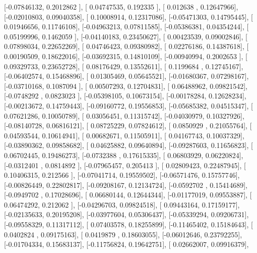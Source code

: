 \documentclass{article}
\begin{document}
       [-0.07846132,  0.2012862 ],
       [ 0.04747535,  0.192335  ],
       [ 0.012638  ,  0.12647966],
       [-0.02010803,  0.09040358],
       [ 0.10008914,  0.12317086],
       [-0.05471303,  0.14795445],
       [ 0.01946656,  0.11746108],
       [-0.04963213,  0.07811585],
       [-0.05386381,  0.04354244],
       [ 0.05199996,  0.1462059 ],
       [-0.04140183,  0.23450627],
       [ 0.00423539,  0.09002846],
       [ 0.07898034,  0.22652269],
       [ 0.04746423,  0.09380982],
       [ 0.02276186,  0.14387618],
       [ 0.00190509,  0.18622016],
       [-0.03692315,  0.14810109],
       [-0.00940994,  0.2002653 ],
       [ 0.09329733,  0.23652728],
       [ 0.08176429,  0.13552611],
       [ 0.1199684 ,  0.12745167],
       [-0.06402574,  0.15468896],
       [ 0.01305469,  0.05645521],
       [-0.01680367,  0.07298167],
       [-0.03710168,  0.1087094 ],
       [ 0.00507293,  0.12704831],
       [ 0.06488962,  0.09821542],
       [-0.0748292 ,  0.0823023 ],
       [-0.05398105,  0.10673154],
       [-0.00178284,  0.12628234],
       [-0.00213672,  0.14759443],
       [-0.09160772,  0.19556853],
       [-0.05685382,  0.04515347],
       [ 0.07621286,  0.10050789],
       [ 0.03056451,  0.11315742],
       [-0.04030979,  0.10327926],
       [-0.08140728,  0.06816121],
       [ 0.08725229,  0.07824612],
       [ 0.0850929 ,  0.21055764],
       [ 0.04593544,  0.10614941],
       [ 0.00682671,  0.11505911],
       [ 0.04167743,  0.10037329],
       [-0.03890362,  0.09858682],
       [ 0.04625882,  0.09640894],
       [-0.09287603,  0.11656823],
       [ 0.06702445,  0.19486273],
       [-0.0732388 ,  0.17615335],
       [ 0.06803929,  0.06220824],
       [-0.0312401 ,  0.0814892 ],
       [-0.07965457,  0.205413  ],
       [ 0.02809423,  0.22487945],
       [ 0.10406315,  0.212566  ],
       [-0.07041714,  0.19559502],
       [-0.06571476,  0.15757746],
       [-0.00826449,  0.22802817],
       [-0.09208167,  0.12134724],
       [-0.0592702 ,  0.15414689],
       [-0.0949702 ,  0.17028696],
       [ 0.06680144,  0.12644344],
       [-0.01177019,  0.09553887],
       [ 0.06474292,  0.212062  ],
       [-0.04296703,  0.09824518],
       [ 0.09443164,  0.17159177],
       [-0.02135633,  0.20195208],
       [-0.03977604,  0.05306437],
       [-0.05339294,  0.09206731],
       [-0.09558329,  0.11317112],
       [ 0.07403578,  0.18255899],
       [-0.11465402,  0.15184643],
       [ 0.0402824 ,  0.09175163],
       [ 0.0419879 ,  0.18603055],
       [-0.06012646,  0.23792255],
       [-0.01704334,  0.15683137],
       [-0.11756824,  0.19642751],
       [ 0.02662007,  0.09916379],
\end{document}
